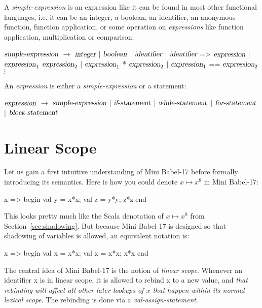 \documentclass{llncs}
\begin{document}
A \emph{simple-expression} is an expression like it can be found in most other functional languages, i.e. it can be an integer, a boolean, an identifier, an anonymous function, function application, or some operation on  \emph{expressions} like function application, multiplication or comparison:
\begin{babellisting}
$\textsl{simple-expression}$ $\longrightarrow$ 
     $\textsl{integer}$ $|$ $\textsl{boolean}$ $|$ $\textsl{identifier}$ 
    $|$ $\textsl{identifier}$ => $\textsl{expression}$
    $|$ $\textsl{expression}_1$ $\textsl{expression}_2$    
    $|$ $\textsl{expression}_1$ * $\textsl{expression}_2$
    $|$ $\textsl{expression}_1$ == $\textsl{expression}_2$    
    $\vdots$
\end{babellisting}
An \emph{expression} is either a \emph{simple-expression} or a statement:
\begin{babellisting}
$\textsl{expression}$ $\longrightarrow$ $\textsl{simple-expression}$ 
             $|$  $\textsl{if-statement}$
             $|$  $\textsl{while-statement}$
             $|$  $\textsl{for-statement}$
             $|$  $\textsl{block-statement}$            
\end{babellisting}

\section{Linear Scope}
Let us gain a first intuitive understanding of Mini Babel-17 before formally introducing its semantics.
Here is how you could denote $x \mapsto x^8$ in Mini Babel-17:
\begin{babellisting}
x => begin val y = x*x; val z = y*y; z*z end
\end{babellisting}
This looks pretty much like the Scala denotation of  $x \mapsto x^8$ from Section~\ref{sec:shadowing}.
But because Mini Babel-17 is designed so that shadowing of variables is allowed, an equivalent notation is:
\begin{babellisting}
x => begin val x = x*x; val x = x*x; x*x end
\end{babellisting}
The central idea of Mini Babel-17 is the notion of \emph{linear scope}. Whenever an identifier x is in linear scope, it is allowed to rebind 
x to a new value, and \emph{that rebinding will affect all other \emph{later} lookups of $x$ that happen within its normal lexical scope}. The rebinding is done via a \emph{val-assign-statement}.
\end{document}
